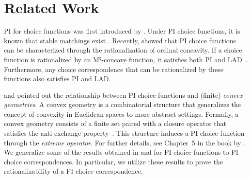 \section{Related Work}

PI for choice functions was first introduced by \citet{plott1973path}. Under PI choice functions, it is known that stable matchings exist \citep{roth1984stability,aygun2013matching, blair1988}. Recently, \citet{yokote2024rationalizing} showed that PI choice functions can be characterized through the rationalization of ordinal concavity. If a choice function is rationalized by an M${}^\natural$-concave function, it satisfies both PI and LAD~\citep{FujishigeTamura2006,MurotaYokoi2015}. Furthermore, any choice correspondence that can be rationalized by these functions also satisfies PI and LAD.

\citet{johnson1996algebraic} and \citet{koshevoy1999choice} pointed out the relationship between PI choice functions and (finite) \emph{convex geometries}.
A convex geometry is a combinatorial structure that generalizes the concept of convexity in Euclidean spaces to more abstract settings. 
Formally, a convex geometry consists of a finite set paired with a closure operator that satisfies the anti-exchange property~\citep{edelman1985convex}. This structure induces a PI choice function through the \emph{extreme operator}. For further details, see Chapter~5 in the book by \citet{GratzerWehrung2016}. %
We generalize some of the results obtained in \citet{johnson1996algebraic} and \citet{koshevoy1999choice} for PI choice functions to PI choice correspondences. In particular,  we utilize these results to prove the rationalizability of a PI choice correspondence.

